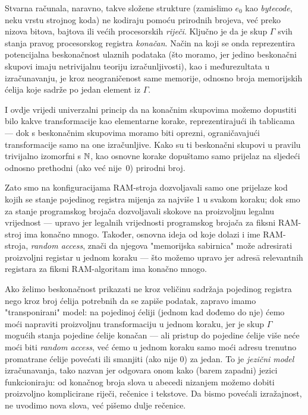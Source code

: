 Stvarna računala, naravno, takve složene strukture (zamislimo $e_0$ kao \emph{bytecode}, neku vrstu strojnog koda) ne kodiraju pomoću prirodnih brojeva, već preko nizova bitova, bajtova ili većih procesorskih \emph{riječi}. Ključno je da je skup $\Gamma$ svih stanja pravog procesorskog registra \emph{konačan}. Način na koji se onda reprezentira potencijalna beskonačnost ulaznih podataka (što moramo, jer jedino beskonačni skupovi imaju netrivijalnu teoriju izračunljivosti), kao i međurezultata u izračunavanju, je kroz neograničenost same memorije, odnosno broja memorijskih ćelija koje sadrže po jedan element iz $\Gamma$.

I ovdje vrijedi univerzalni princip da na konačnim skupovima možemo dopustiti bilo kakve transformacije kao elementarne korake, reprezentirajući ih tablicama --- dok s beskonačnim skupovima moramo biti oprezni, ograničavajući transformacije samo na one izračunljive. Kako su ti beskonačni skupovi u pravilu trivijalno izomorfni s ${\mathbb N}$, kao osnovne korake dopuštamo samo prijelaz na sljedeći odnosno prethodni (ako već nije~$0$) prirodni broj.

Zato smo na konfiguracijama RAM-stroja dozvoljavali samo one prijelaze kod kojih se stanje pojedinog registra mijenja za najviše $1$ u svakom koraku; dok smo za stanje programskog brojača dozvoljavali skokove na proizvoljnu legalnu vrijednost --- upravo jer legalnih vrijednosti programskog brojača za fiksni RAM-stroj ima konačno mnogo. Također, osnovna ideja od koje dolazi i ime RAM-stroja, \emph{random access}, znači da njegova "memorijska sabirnica" može adresirati proizvoljni registar u jednom koraku --- što možemo upravo jer adres\=a relevantnih registara za fiksni RAM-algoritam ima konačno mnogo.

Ako želimo beskonačnost prikazati ne kroz veličinu sadržaja pojedinog registra nego kroz broj ćelija potrebnih da se zapiše podatak, zapravo imamo "transponirani" model: na pojedinoj ćeliji (jednom kad dođemo do nje) ćemo moći napraviti proizvoljnu transformaciju u jednom koraku, jer je skup $\Gamma$ mogućih stanja pojedine ćelije konačan --- ali pristup do pojedine ćelije više neće moći biti \emph{random access}, već ćemo u jednom koraku samo moći adresu trenutno promatrane ćelije povećati ili smanjiti (ako nije $0$) za jedan. To je \emph{jezični model} izračunavanja, tako nazvan jer odgovara onom kako (barem zapadni) jezici funkcioniraju: od konačnog broja slova u abecedi nizanjem možemo dobiti proizvoljno komplicirane riječi, rečenice i tekstove. Da bismo povećali izražajnost, ne uvodimo nova slova, već pišemo dulje rečenice.

